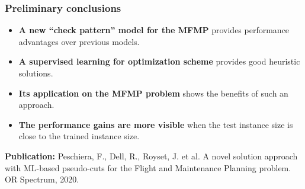 \begin{frame}
\frametitle{\textbf{Preliminary conclusions}}
  \pause
    \begin{itemize}[<+->]
    \item \textbf{A new ``check pattern'' model for the MFMP}
      provides performance advantages over previous models.
    \item \textbf{A supervised learning for optimization scheme}
      provides good heuristic solutions.
    \item \textbf{Its application on the MFMP problem}
      shows the benefits of such an approach.
    \item \textbf{The performance gains are more visible}
      when the test instance size is close to the trained instance size.
    \end{itemize}
  \pause
  \textbf{Publication:} Peschiera, F., Dell, R., Royset, J. et al. A novel solution approach with ML-based pseudo-cuts for the Flight and Maintenance Planning problem. OR Spectrum, 2020.
\end{frame}